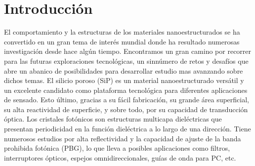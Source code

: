 \documentclass[a4paper,11pt,]{book}
\begin{document}
\section{Introducci\'on}
El comportamiento y la estructuras de los materiales nanoestructurados se ha convertido en un gran tema de interés mundial donde ha resultado numerosas  investigación desde hace algún tiempo.\cite{I1} Encontramos un gran camino por recorrer  para las futuras exploraciones tecnológicas, un sinnúmero de retos y desafíos que abre un abanico de posibilidades para desarrollar estudio mas avanzando sobre dichos temas.\cite{I2} El silicio poroso (SiP) es un material nanoestructurado versátil y un excelente candidato como plataforma tecnológica para diferentes aplicaciones de sensado.\cite{I3,I4} Esto último, gracias a su fácil fabricación, su grande área superficial, su alta reactividad de superficie, y sobre todo, por su capacidad de transducción óptica. Los cristales fotónicos  son estructuras multicapa dieléctricas que presentan periodicidad en la función dieléctrica a lo largo de una dirección.\cite{I5} Tiene numerosos  estudios por  alta reflectividad y la capacidad de ajuste de la banda prohibida fotónica (PBG)\cite{I6}, lo que lleva a posibles aplicaciones como filtros, \cite{I7} interruptores ópticos, \cite{I8} espejos omnidireccionales, \cite{I9} guías de onda para PC, \cite{I10}  etc.
\end{document}
